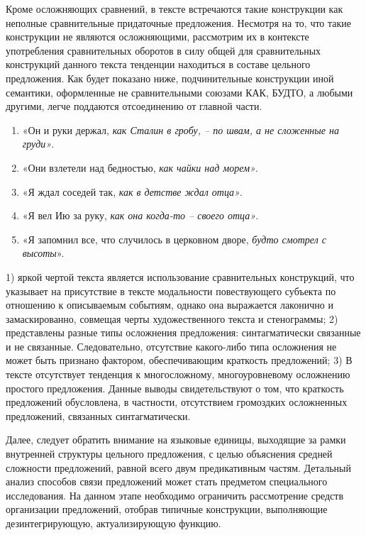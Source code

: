 \documentclass{kursa4}
\begin{document}
{{      Кроме осложняющих сравнений, в тексте встречаются такие конструкции  как неполные сравнительные придаточные предложения. Несмотря на то, что такие конструкции не являются осложняющими, рассмотрим их в контексте употребления сравнительных оборотов в силу общей для сравнительных конструкций данного текста тенденции находиться в составе цельного предложения. Как будет показано ниже, подчинительные конструкции иной семантики, оформленные не сравнительными союзами КАК, БУДТО, а любыми другими, легче поддаются отсоединению от главной части. 
       \begin{enumerate}
          \item «Он и руки держал, \textit{как Сталин в гробу, – по швам, а не сложенные на груди»}.
          \item «Они взлетели над бедностью, \textit{как чайки над морем»}.
          \item «Я ждал соседей так, \textit{как в детстве ждал отца»}.
          \item «Я вел Ию за руку, \textit{как она когда-то – своего отца»}.
          \item «Я запомнил все, что случилось в церковном дворе, \textit{будто смотрел с высоты}».
      \end{enumerate}

       1) яркой чертой текста является использование сравнительных конструкций, что указывает на присутствие в тексте модальности повествующего субъекта по отношению к описываемым событиям, однако она выражается лаконично и замаскированно, совмещая черты художественного текста и стенограммы; 2) представлены разные типы осложнения предложения: синтагматически связанные и не связанные. Следовательно, отсутствие какого-либо типа осложнения не может быть признано фактором, обеспечивающим краткость предложений; 3) В тексте отсутствует тенденция к многосложному, многоуровневому осложнению простого предложения. Данные выводы свидетельствуют о том, что краткость предложений обусловлена, в частности, отсутствием громоздких осложненных предложений, связанных синтагматически.
          
      Далее, следует обратить внимание на языковые единицы, выходящие за рамки внутренней структуры цельного предложения, с целью объяснения средней сложности предложений, равной всего двум предикативным частям.   Детальный анализ способов связи предложений может стать предметом специального исследования. На данном этапе необходимо ограничить рассмотрение средств организации предложений, отобрав типичные конструкции, выполняющие дезинтегрирующую, актуализирующую функцию.
        
}}
\end{document}
